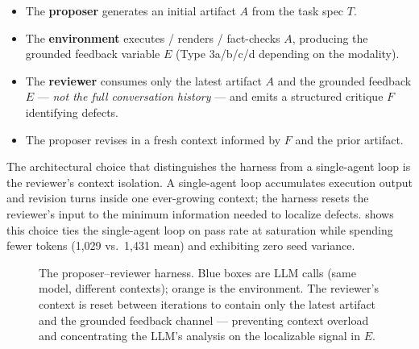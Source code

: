 \documentclass[11pt]{article}
\begin{document}
\begin{itemize}[leftmargin=*,topsep=0.2ex,itemsep=0.2ex]
\item The \textbf{proposer} generates an initial artifact $A$ from the task spec $T$.
\item The \textbf{environment} executes / renders / fact-checks $A$, producing the grounded feedback variable $E$ (Type 3a/b/c/d depending on the modality).
\item The \textbf{reviewer} consumes only the latest artifact $A$ and the grounded feedback $E$ --- \emph{not the full conversation history} --- and emits a structured critique $F$ identifying defects.
\item The proposer revises in a fresh context informed by $F$ and the prior artifact.
\end{itemize}

The architectural choice that distinguishes the harness from a single-agent loop is the reviewer's context isolation. A single-agent loop accumulates execution output and revision turns inside one ever-growing context; the harness resets the reviewer's input to the minimum information needed to localize defects.  shows this choice ties the single-agent loop on pass rate at saturation while spending fewer tokens (1{,}029 vs.\ 1{,}431 mean) and exhibiting zero seed variance.

\begin{figure}[t]
\centering
{}
\caption{The proposer--reviewer harness. Blue boxes are LLM calls (same model, different contexts); orange is the environment. The reviewer's context is reset between iterations to contain only the latest artifact and the grounded feedback channel --- preventing context overload and concentrating the LLM's analysis on the localizable signal in $E$.}
\label{fig:harness}
\end{figure}
\end{document}
